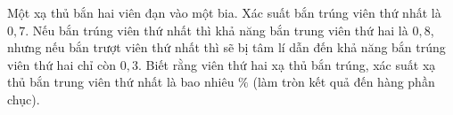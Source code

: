 \begin{ex}%
	Một xạ thủ bắn hai viên đạn vào một bia. Xác suất bắn trúng viên thứ nhất là $0{,}7$. Nếu bắn trúng viên thứ nhất thì khả năng bắn trung viên thứ hai là $0{,}8$, nhưng nếu bắn trượt viên thứ nhất thì sẽ bị tâm lí dẫn đến khả năng bắn trúng viên thứ hai chỉ còn $0{,}3$. Biết rằng viên thứ hai xạ thủ bắn trúng, xác suất xạ thủ bắn trung viên thứ nhất là bao nhiêu $\%$ (làm tròn kết quả đến hàng phần chục).
	
\end{ex}
\renewcommand{\baselinestretch}{1.4}
